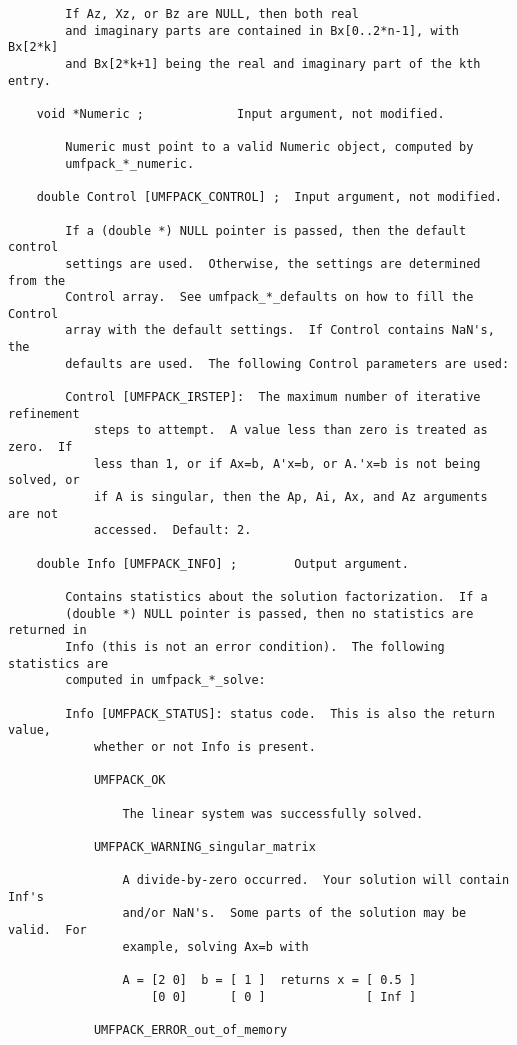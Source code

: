 \documentclass[11pt]{article}
\begin{document}
{\begin{verbatim}
        If Az, Xz, or Bz are NULL, then both real
        and imaginary parts are contained in Bx[0..2*n-1], with Bx[2*k]
        and Bx[2*k+1] being the real and imaginary part of the kth entry.

    void *Numeric ;             Input argument, not modified.

        Numeric must point to a valid Numeric object, computed by
        umfpack_*_numeric.

    double Control [UMFPACK_CONTROL] ;  Input argument, not modified.

        If a (double *) NULL pointer is passed, then the default control
        settings are used.  Otherwise, the settings are determined from the
        Control array.  See umfpack_*_defaults on how to fill the Control
        array with the default settings.  If Control contains NaN's, the
        defaults are used.  The following Control parameters are used:

        Control [UMFPACK_IRSTEP]:  The maximum number of iterative refinement
            steps to attempt.  A value less than zero is treated as zero.  If
            less than 1, or if Ax=b, A'x=b, or A.'x=b is not being solved, or
            if A is singular, then the Ap, Ai, Ax, and Az arguments are not
            accessed.  Default: 2.

    double Info [UMFPACK_INFO] ;        Output argument.

        Contains statistics about the solution factorization.  If a
        (double *) NULL pointer is passed, then no statistics are returned in
        Info (this is not an error condition).  The following statistics are
        computed in umfpack_*_solve:

        Info [UMFPACK_STATUS]: status code.  This is also the return value,
            whether or not Info is present.

            UMFPACK_OK

                The linear system was successfully solved.

            UMFPACK_WARNING_singular_matrix

                A divide-by-zero occurred.  Your solution will contain Inf's
                and/or NaN's.  Some parts of the solution may be valid.  For
                example, solving Ax=b with

                A = [2 0]  b = [ 1 ]  returns x = [ 0.5 ]
                    [0 0]      [ 0 ]              [ Inf ]

            UMFPACK_ERROR_out_of_memory


\end{verbatim}}
\end{document}
